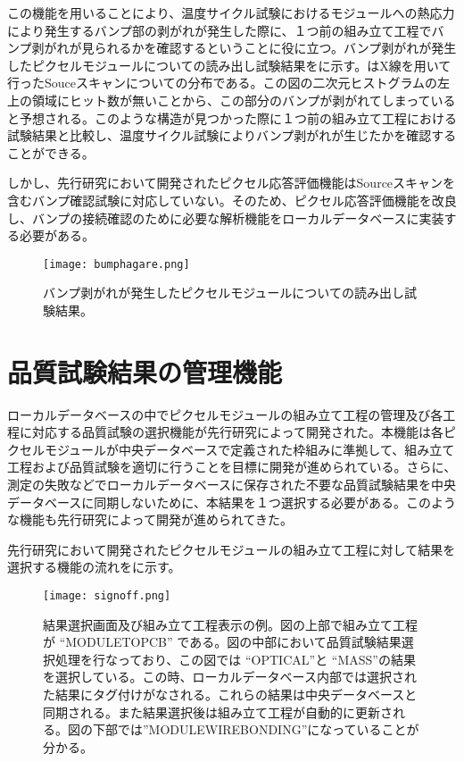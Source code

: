 この機能を用いることにより、温度サイクル試験におけるモジュールへの熱応力により発生するバンプ部の剥がれが発生した際に、１つ前の組み立て工程でバンプ剥がれが見られるかを確認するということに役に立つ。バンプ剥がれが発生したピクセルモジュールについての読み出し試験結果をに示す。はX線を用いて行ったSouceスキャンについての分布である。この図の二次元ヒストグラムの左上の領域にヒット数が無いことから、この部分のバンプが剥がれてしまっていると予想される。このような構造が見つかった際に１つ前の組み立て工程における試験結果と比較し、温度サイクル試験によりバンプ剥がれが生じたかを確認することができる。

しかし、先行研究において開発されたピクセル応答評価機能はSourceスキャンを含むバンプ確認試験に対応していない。そのため、ピクセル応答評価機能を改良し、バンプの接続確認のために必要な解析機能をローカルデータベースに実装する必要がある。


\begin{figure}[tbp]
  \centering
  \texttt{[image: bumphagare.png]}
  \caption[バンプ剥がれが発生したピクセルモジュールについての読み出し試験結果]{バンプ剥がれが発生したピクセルモジュールについての読み出し試験結果。}
  \label{fig:bumphagare}
\end{figure}



\section{品質試験結果の管理機能}
\label{sec:kanri}

ローカルデータベースの中でピクセルモジュールの組み立て工程の管理及び各工程に対応する品質試験の選択機能が先行研究\cite{oku}によって開発された。本機能は各ピクセルモジュールが中央データベースで定義された枠組みに準拠して、組み立て工程および品質試験を適切に行うことを目標に開発が進められている。さらに、測定の失敗などでローカルデータベースに保存された不要な品質試験結果を中央データベースに同期しないために、本結果を１つ選択する必要がある。このような機能も先行研究によって開発が進められてきた。

先行研究において開発されたピクセルモジュールの組み立て工程に対して結果を選択する機能の流れをに示す。
\begin{figure}[tbp]
  \centering
  \texttt{[image: signoff.png]}
  \caption[結果選択画面及び組み立て工程表示の例]{結果選択画面及び組み立て工程表示の例\cite{oku}。図の上部で組み立て工程が “MODULETOPCB” である。図の中部において品質試験結果選択処理を行なっており、この図では “OPTICAL”と “MASS”の結果を選択している。この時、ローカルデータベース内部では選択された結果にタグ付けがなされる。これらの結果は中央データベースと同期される。また結果選択後は組み立て工程が自動的に更新される。図の下部では”MODULEWIREBONDING”になっていることが分かる。}
  \label{fig:sign-off}
\end{figure}

